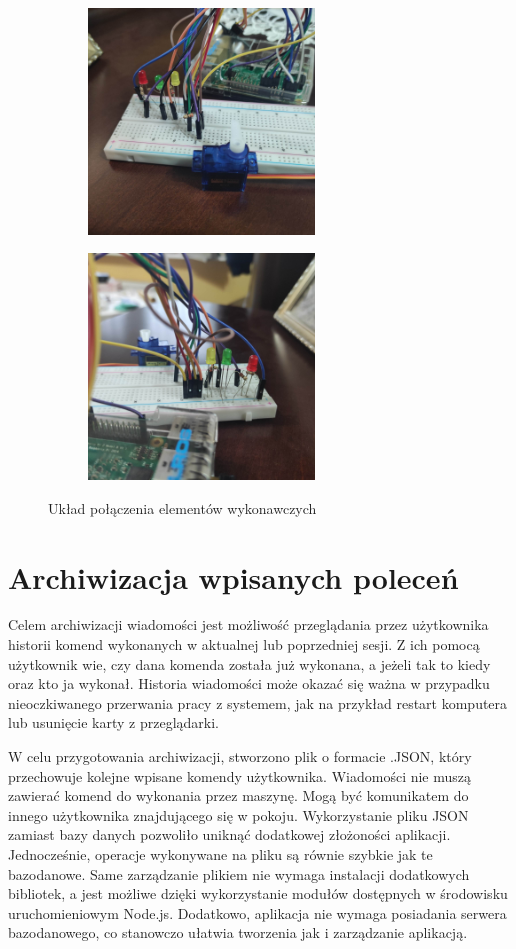 \begin{figure}[h]
\begin{subfigure}{0.5\textwidth}
\includegraphics[width=0.9\linewidth, height=6cm]{"obrazy/ukladpolaczenia3"} 

\end{subfigure}
\begin{subfigure}{0.5\textwidth}
\includegraphics[width=0.9\linewidth, height=6cm]{"obrazy/ukladpolaczenia2"}

\end{subfigure}

\caption{Układ połączenia elementów wykonawczych}
\label{fig49}
\end{figure}

\section{Archiwizacja wpisanych poleceń}
Celem archiwizacji wiadomości jest możliwość przeglądania przez użytkownika historii komend wykonanych w aktualnej lub poprzedniej sesji. Z ich pomocą użytkownik wie, czy dana komenda została już wykonana, a jeżeli tak to kiedy oraz kto ja wykonał. Historia wiadomości może okazać się ważna w przypadku nieoczkiwanego przerwania pracy z systemem, jak na przykład restart komputera lub usunięcie karty z przeglądarki.

W celu przygotowania archiwizacji, stworzono plik o formacie .JSON, który przechowuje kolejne wpisane komendy użytkownika. Wiadomości nie muszą zawierać komend do wykonania przez maszynę. Mogą być komunikatem do innego użytkownika znajdującego się w pokoju. Wykorzystanie pliku JSON zamiast bazy danych pozwoliło uniknąć dodatkowej złożoności aplikacji. Jednocześnie, operacje wykonywane na pliku są równie szybkie jak te bazodanowe. Same zarządzanie plikiem nie wymaga instalacji dodatkowych bibliotek, a jest możliwe dzięki wykorzystanie modułów dostępnych w środowisku uruchomieniowym Node.js. Dodatkowo, aplikacja nie wymaga posiadania serwera bazodanowego, co stanowczo ułatwia tworzenia jak i zarządzanie aplikacją.

